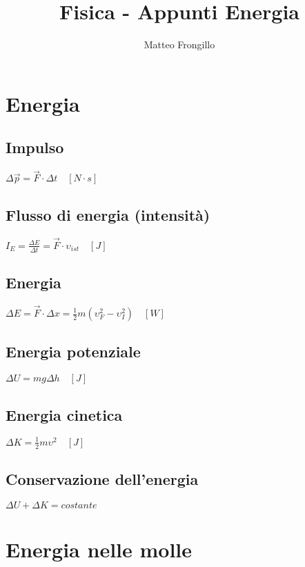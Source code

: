 \documentclass[a4paper, 12pt]{article}
\title{Fisica - Appunti Energia}
\author{Matteo Frongillo}
\newcommand{\spazio}{\hspace{0cm}}
\begin{document}
\maketitle
\tableofcontents

\pagebreak

\section{Energia}

    \subsection*{Impulso}
    \spazio \(\Delta\vec{p}=\vec{F} \cdot \Delta{t} \quad [N \cdot s]\)

    \subsection*{Flusso di energia (intensità)}
    \spazio \(I_{E}=\frac{\Delta{E}}{\Delta{t}} = \vec{F} \cdot \upsilon_{ist} \quad [J]\)

    \subsection*{Energia}
    \spazio \(\Delta{E}=\vec{F} \cdot \Delta{x} = \frac{1}{2}m(\upsilon^2_F-\upsilon^2_I) \quad [W]\)

    \subsection*{Energia potenziale}
    \spazio \(\Delta{U}=mg\Delta{h} \quad [J]\)

    \subsection*{Energia cinetica}
    \spazio \(\Delta{K} =\frac{1}{2}m\upsilon^2 \quad [J]\)

    \subsection*{Conservazione dell'energia}
    \spazio \(\Delta{U}+\Delta{K}=costante\)

\vspace{.5cm}
\section{Energia nelle molle}
\end{document}
